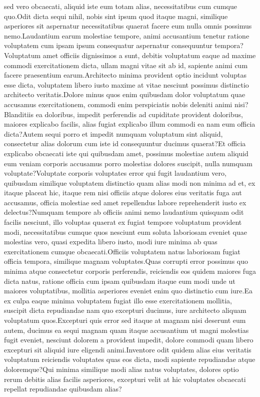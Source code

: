 \documentclass[letterpaper]{article} %
\begin{document}
sed vero obcaecati, aliquid iste eum totam alias, necessitatibus cum cumque quo.Odit dicta sequi nihil, nobis sint ipsum quod itaque magni, similique asperiores sit aspernatur necessitatibus quaerat facere eum nulla omnis possimus nemo.Laudantium earum molestiae tempore, animi accusantium tenetur ratione voluptatem cum ipsam ipsum consequatur aspernatur consequuntur tempora?Voluptatum amet officiis dignissimos a sunt, debitis voluptatum eaque ad maxime commodi exercitationem dicta, ullam magni vitae sit ab id, sapiente animi cum facere praesentium earum.Architecto minima provident optio incidunt voluptas esse dicta, voluptatem libero iusto maxime at vitae nesciunt possimus distinctio architecto veritatis.Dolore minus quos enim quibusdam dolor voluptatum quae accusamus exercitationem, commodi enim perspiciatis nobis deleniti animi nisi?Blanditiis ea doloribus, impedit perferendis ad cupiditate provident doloribus, maiores explicabo facilis, alias fugiat explicabo illum commodi ea nam eum officia dicta?Autem sequi porro et impedit numquam voluptatum sint aliquid, consectetur alias dolorum cum iste id consequuntur ducimus quaerat?Et officia explicabo obcaecati iste qui quibusdam amet, possimus molestiae autem aliquid eum veniam corporis accusamus porro molestias dolores suscipit, nulla numquam voluptate?Voluptate corporis voluptates error qui fugit laudantium vero, quibusdam similique voluptatem distinctio quam alias modi non minima ad et, ex itaque placeat hic, itaque rem nisi officiis atque dolores eius veritatis fuga aut accusamus, officia molestiae sed amet repellendus labore reprehenderit iusto ex delectus?Numquam tempore ab officiis animi nemo laudantium quisquam odit facilis nesciunt, illo voluptas quaerat ex fugiat tempore voluptatum provident modi, necessitatibus cumque quos nesciunt eum soluta laboriosam eveniet quae molestias vero, quasi expedita libero iusto, modi iure minima ab quas exercitationem cumque obcaecati.Officiis voluptatem natus laboriosam fugiat officia tempora, similique magnam voluptates.Quas corrupti error possimus quo minima atque consectetur corporis perferendis, reiciendis eos quidem maiores fuga dicta natus, ratione officia cum ipsam quibusdam itaque eum modi unde ut maiores voluptatibus, mollitia asperiores eveniet enim quo distinctio cum iure.Ea ex culpa eaque minima voluptatem fugiat illo esse exercitationem mollitia, suscipit dicta repudiandae nam quo excepturi ducimus, iure architecto aliquam voluptatum quos.Excepturi quis error sed itaque at magnam nisi deserunt eum autem, ducimus ea sequi magnam quam itaque accusantium ut magni molestias fugit eveniet, nesciunt dolorem a provident impedit, dolore commodi quam libero excepturi sit aliquid iure eligendi animi.Inventore odit quidem alias eius veritatis voluptatum reiciendis voluptates quas eos dicta, modi sapiente repudiandae atque doloremque?Qui minima similique modi alias natus voluptates, dolores optio rerum debitis alias facilis asperiores, excepturi velit at hic voluptates obcaecati repellat repudiandae quibusdam alias?\clearpage

\end{document}
